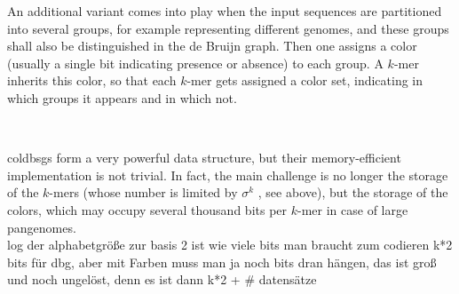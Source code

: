 \noindent An additional variant comes into play when the input sequences are partitioned into several groups, for example representing different genomes, and these groups shall also be distinguished in the de Bruijn graph.
Then one assigns a color (usually a single bit indicating presence or absence) to each group.
A $k$-mer inherits this color, so that each $k$-mer gets assigned a color set, indicating in which groups it appears and in which not.


\begin{bsp}
    $\ $
    \begin{figure}[H]
        \centering
        \label{fig:figure7}
    \end{figure}
\end{bsp}

\begin{prob}
    \Glspl{coldbsg} form a very powerful data structure, but their memory-efficient implementation is not trivial.
    In fact, the main challenge is no longer the storage of the     $k$-mers (whose number is limited by $\sigma^k$ , see above), but the storage of the colors, which may occupy several thousand bits per $k$-mer in case of large pangenomes. \\     log der alphabetgröße zur basis 2 ist wie viele bits man braucht zum codieren k*2 bits für dbg, aber mit Farben muss man ja noch bits dran hängen, das ist groß und noch ungelöst, denn es ist dann k*2 + \# datensätze
\end{prob}

